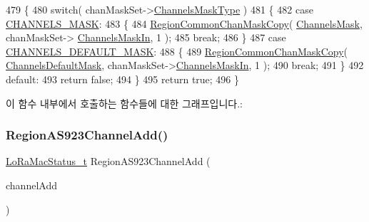 \begin{DoxyCode}
479 \{
480     \textcolor{keywordflow}{switch}( chanMaskSet->\mbox{\hyperlink{structs_chan_mask_set_params_a02b75be74cbc34fa2126b2c250ea9283}{ChannelsMaskType}} )
481     \{
482         \textcolor{keywordflow}{case} \mbox{\hyperlink{group___r_e_g_i_o_n_gga7a62e669f567fc160ad58210664bca9ca1e68275c0b16a0c4935eada4315dd089}{CHANNELS\_MASK}}:
483         \{
484             \mbox{\hyperlink{group___r_e_g_i_o_n_c_o_m_m_o_n_ga95f5199d490113269fae7f2e0569e9a0}{RegionCommonChanMaskCopy}}( \mbox{\hyperlink{_region_a_s923_8c_a2188957b5ca6af8092154d7ccbfa5757}{ChannelsMask}}, chanMaskSet->
      \mbox{\hyperlink{structs_chan_mask_set_params_ade387d6ecaf27781b14ad97ebdfc0695}{ChannelsMaskIn}}, 1 );
485             \textcolor{keywordflow}{break};
486         \}
487         \textcolor{keywordflow}{case} \mbox{\hyperlink{group___r_e_g_i_o_n_gga7a62e669f567fc160ad58210664bca9ca9bbb18c8600ad8781ba04a2cb121ea60}{CHANNELS\_DEFAULT\_MASK}}:
488         \{
489             \mbox{\hyperlink{group___r_e_g_i_o_n_c_o_m_m_o_n_ga95f5199d490113269fae7f2e0569e9a0}{RegionCommonChanMaskCopy}}( 
      \mbox{\hyperlink{_region_a_s923_8c_ac127b19779301713d5ed92eb03366a2d}{ChannelsDefaultMask}}, chanMaskSet->\mbox{\hyperlink{structs_chan_mask_set_params_ade387d6ecaf27781b14ad97ebdfc0695}{ChannelsMaskIn}}, 1 );
490             \textcolor{keywordflow}{break};
491         \}
492         \textcolor{keywordflow}{default}:
493             \textcolor{keywordflow}{return} \textcolor{keyword}{false};
494     \}
495     \textcolor{keywordflow}{return} \textcolor{keyword}{true};
496 \}
\end{DoxyCode}
이 함수 내부에서 호출하는 함수들에 대한 그래프입니다.\+:
\mbox{\label{group___r_e_g_i_o_n_a_s923_ga7477b7737c48e88f1d82a7ef70eb7b56}} 
\subsubsection{\texorpdfstring{Region\+A\+S923\+Channel\+Add()}{RegionAS923ChannelAdd()}}
{\footnotesize\ttfamily \mbox{\hyperlink{group___l_o_r_a_m_a_c_ga30bd25657e10480f8605ee951b0ecfbd}{Lo\+Ra\+Mac\+Status\+\_\+t}} Region\+A\+S923\+Channel\+Add (\begin{DoxyParamCaption}\item[{\mbox{\hyperlink{group___r_e_g_i_o_n_gab1c5f3aa06614283202906cef4417860}{Channel\+Add\+Params\+\_\+t}} $\ast$}]{channel\+Add }\end{DoxyParamCaption})}



